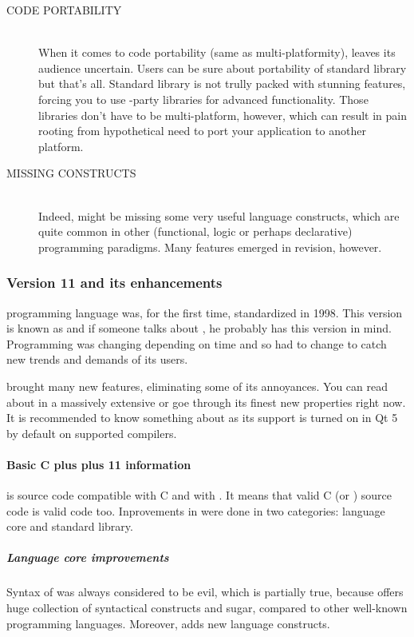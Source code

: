 \begin{description}
\item[CODE PORTABILITY\ts{\textcolor{red}{bad}}]\hfill \\
When it comes to code portability (same as multi-platformity), \cpp leaves its audience uncertain. Users can be sure about portability of \cpp standard library but that's all. Standard library is not trully packed with stunning features, forcing you to use -party libraries for advanced functionality. Those libraries don't have to be multi-platform, however, which can result in pain rooting from hypothetical need to port your application to another platform.

\item[MISSING CONSTRUCTS\ts{\textcolor{red}{bad}}]\hfill \\
Indeed, \cpp might be missing some very useful language constructs, which are quite common in other (\eg functional, logic or perhaps declarative) programming paradigms. Many features emerged in  revision, however.
\end{description}

\subsubsection{Version 11 and its enhancements}
\cpp programming language was, for the first time, standardized in 1998. This version is known as  and if someone talks about \cpp, he probably has this version in mind. Programming was changing depending on time and so \cpp had to change to catch new trends and demands of its users.

 brought many new features, eliminating some of its annoyances. You can read about  in a massively extensive \citep{various:cppstandard} or goe through its finest new properties right now. It is recommended to know something about  as its support is turned on in Qt 5 by default on supported compilers.

\paragraph{Basic C plus plus 11 information}
 is source code compatible with C and with . It means that valid C (or ) source code is valid  code too. Inprovements in \cpp were done in two categories: language core and standard library.

\subparagraph{Language core improvements}
Syntax of \cpp was always considered to be evil, which is partially true, because \cpp offers huge collection of syntactical constructs and sugar, compared to other well-known programming languages. Moreover,  adds new language constructs.

